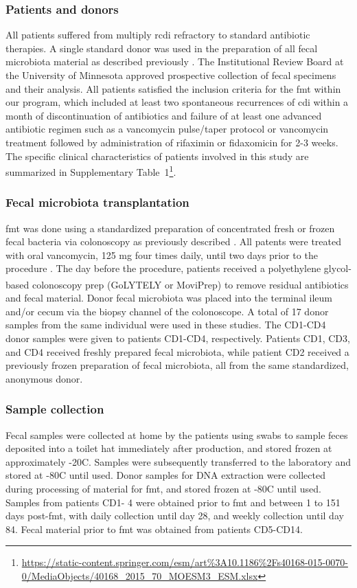 \subsubsection{Patients and donors}
All patients suffered from multiply \gls{rcdi} refractory to standard antibiotic therapies. A single standard donor was used in the preparation of all fecal microbiota material as described previously \cite{RN45}. The Institutional Review Board at the University of Minnesota approved prospective collection of fecal specimens and their analysis. All patients satisfied the inclusion criteria for the \gls{fmt} within our program, which included at least two spontaneous recurrences of \gls{cdi} within a month of discontinuation of antibiotics and failure of at least one advanced antibiotic regimen such as a vancomycin pulse/taper protocol or vancomycin treatment followed by administration of rifaximin or fidaxomicin for 2-3 weeks.  The specific clinical characteristics of patients involved in this study are summarized in Supplementary Table~1\footnote{\url{https://static-content.springer.com/esm/art\%3A10.1186\%2Fs40168-015-0070-0/MediaObjects/40168_2015_70_MOESM3_ESM.xlsx}}.  

\subsubsection{Fecal microbiota transplantation}
\Gls{fmt} was done using a standardized preparation of concentrated fresh or frozen fecal bacteria via colonoscopy as previously described \cite{RN45}. All patents were treated with oral vancomycin, 125 mg four times daily, until two days prior to the procedure \cite{RN45}. The day before the procedure, patients received a polyethylene glycol-based colonoscopy prep (GoLYTELY\textsuperscript{\textregistered} or MoviPrep\textsuperscript{\textregistered}) to remove residual antibiotics and fecal material. Donor fecal microbiota was placed into the terminal ileum and/or cecum via the biopsy channel of the colonoscope. A total of 17 donor samples from the same individual were used in these studies.  The CD1-CD4 donor samples were given to patients CD1-CD4, respectively. Patients CD1, CD3, and CD4 received freshly prepared fecal microbiota, while patient CD2 received a previously frozen preparation of fecal microbiota, all from the same standardized, anonymous donor.

\subsubsection{Sample collection}
Fecal samples were collected at home by the patients using swabs to sample feces deposited into a toilet hat immediately after production, and stored frozen at approximately -20\textdegree C. Samples were subsequently transferred to the laboratory and stored at -80\textdegree C until used. Donor samples for DNA extraction were collected during processing of material for \gls{fmt}, and stored frozen at       -80\textdegree C until used. Samples from patients CD1- 4 were obtained prior to \gls{fmt} and between 1 to 151 days post-\gls{fmt}, with daily collection until day 28, and weekly collection until day 84. Fecal material prior to \gls{fmt} was obtained from patients CD5-CD14.

